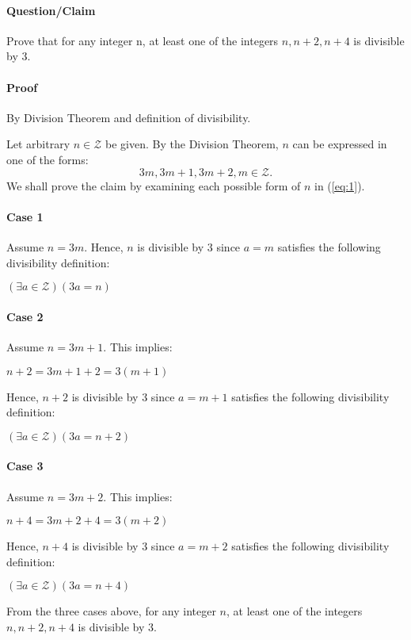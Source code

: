 \documentclass[14pt]{extarticle}
\begin{document}
	\paragraph{Question/Claim}
	Prove that for any integer n, at least one of the integers $n, n+2, n+4$ is divisible by 3.
	\paragraph{Proof} By Division Theorem and definition of divisibility.
	\par\bigskip
	Let arbitrary $n \in \mathcal{Z}$ be given.  By the Division Theorem, $n$ can be expressed in one of the forms:
	\begin{equation}\label{eq:1}
	3m, 3m+1, 3m+2, m \in \mathcal{Z}.
	\end{equation}
	We shall prove the claim by examining each possible form of $n$ in (\ref{eq:1}).
	\paragraph{Case 1} Assume $n=3m$.  Hence, $n$ is divisible by 3 since $a=m$ satisfies the following divisibility definition:
	\begin{center}
	$(\exists a \in \mathcal{Z})(3a=n)$
	\end{center}
	\paragraph{Case 2} Assume $n=3m+1$.  This implies:
	\begin{center}
	$n+2 = 3m+1+2 = 3(m+1)$	
	\end{center}
	Hence, $n+2$ is divisible by 3 since $a=m+1$ satisfies the following divisibility definition:
	\begin{center}
	$(\exists a \in \mathcal{Z})(3a=n+2)$
	\end{center}
	\paragraph{Case 3} Assume $n=3m+2$.  This implies:
	\begin{center}
		$n+4 = 3m+2+4 = 3(m+2)$	
	\end{center}
	Hence, $n+4$ is divisible by 3 since $a=m+2$ satisfies the following divisibility definition:
	\begin{center}
	$(\exists a \in \mathcal{Z})(3a=n+4)$
	\end{center}
	From the three cases above, for any integer $n$, at least one of the integers $n, n+2, n+4$ is divisible by 3.
\end{document}
